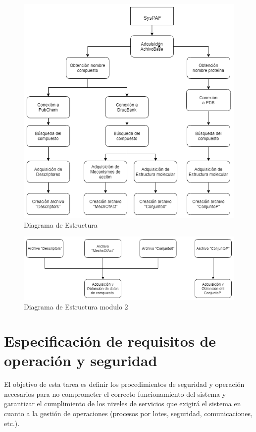 \begin{figure}[H]
    \centering
\includegraphics[scale=0.5]{Capitulo3/images/1_5Estructura.png}
    \caption{Diagrama de Estructura}
    \label{Diagramas_de_estructura}
\end{figure}

\begin{figure}[H]
    \centering
    \includegraphics[scale=0.5]{Capitulo3/images/1_5EstructuraMod2.png}
    \caption{Diagrama de Estructura modulo 2}
    \label{Diagrama_Estruct_mod2}
\end{figure}
\section{Especificación de requisitos de operación y seguridad}
\noindent El objetivo de esta tarea es definir los procedimientos de seguridad y operación
necesarios para no comprometer el correcto funcionamiento del sistema y garantizar el
cumplimiento de los niveles de servicios que exigirá el sistema en cuanto a la gestión de
operaciones (procesos por lotes, seguridad, comunicaciones, etc.).

